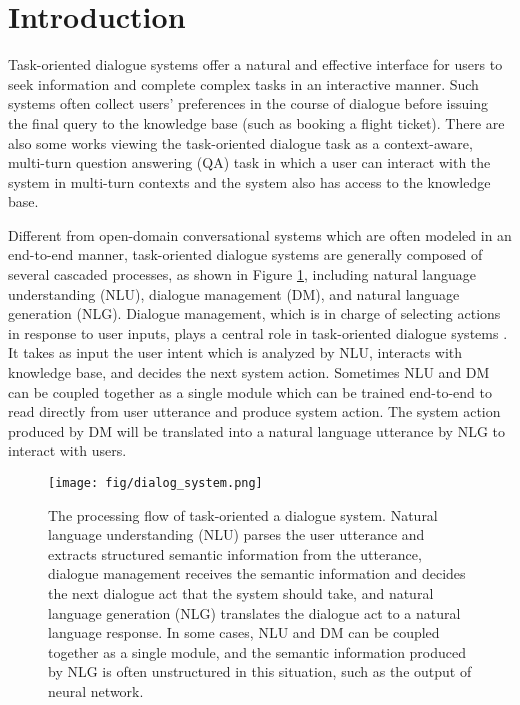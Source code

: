 
\section{Introduction}
Task-oriented dialogue systems offer a natural and effective interface for users to seek information and complete complex tasks in an interactive manner. Such systems often collect users' preferences in the course of dialogue before issuing the final query to the knowledge base (such as booking a flight ticket). There are also some works \cite{hixon2015learning, saha2018complex} viewing the task-oriented dialogue task as a context-aware, multi-turn question answering (QA) task in which a user can interact with the system in multi-turn contexts and the system also has access to the knowledge base.

 Different from open-domain conversational systems which are often modeled in an end-to-end manner, task-oriented dialogue systems are generally composed of several cascaded processes, as shown in Figure \ref{fig:dialog_system}, including natural language understanding (NLU), dialogue management (DM), and natural language generation (NLG).
Dialogue management, which is in charge of selecting actions in response to user inputs, plays a central role in task-oriented dialogue systems \cite{williams2007partially, ge2dialogue}. It takes as input the user intent which is analyzed by NLU, interacts with knowledge base, and decides the next system action. Sometimes NLU and DM can be coupled together as a single module which can be trained end-to-end to read directly from user utterance and produce system action. The system action produced by DM will be translated into a natural language utterance by NLG \cite{wen2015semantically} to interact with users. 


\begin{figure}
  \texttt{[image: fig/dialog\_system.png]}
  \caption{The processing flow of task-oriented a dialogue system. Natural language understanding (NLU) parses the user utterance and extracts structured semantic information from the utterance, dialogue management receives the semantic information and decides the next dialogue act that the system should take, and natural language generation (NLG) translates the dialogue act to a natural language response. In some cases, NLU and DM can be coupled together as a single module, and the semantic information produced by NLG is often unstructured in this situation, such as the output of neural network.
  }
  \label{fig:dialog_system}
\end{figure}


